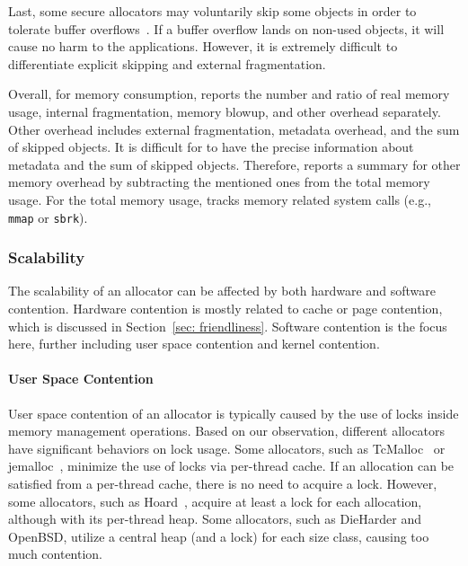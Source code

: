  Last, some secure allocators may voluntarily skip some objects in order to tolerate buffer overflows~\citep{DieHard, DieHarder, Guarder}. If a buffer overflow lands on non-used objects, it will cause no harm to the applications. However, it is extremely difficult to differentiate explicit skipping and external fragmentation. 

Overall, for memory consumption, \MP{} reports the number and ratio of real memory usage, internal fragmentation, memory blowup, and other overhead separately. Other overhead includes external fragmentation, metadata overhead, and the sum of skipped objects. It is difficult for \MP{} to have the precise information about metadata and the sum of skipped objects. Therefore, \MP{} reports a summary for other memory overhead by subtracting the mentioned ones from the total memory usage. For the total memory usage, \MP{} tracks memory related system calls (e.g., \texttt{mmap} or \texttt{sbrk}). 


\subsubsection{Scalability} 
\label{sec:scalability}

The scalability of an allocator can be affected by both hardware and software contention. Hardware contention is mostly related to cache or page contention, which is discussed in Section~\ref{sec: friendliness}. Software contention is the focus here, further including user space contention and kernel contention. 

\paragraph{User Space Contention} User space contention of an allocator is typically caused by the use of locks inside memory management operations. Based on our observation, different allocators have significant behaviors on lock usage. Some allocators, such as TcMalloc~\citep{tcmalloc} or jemalloc~\citep{jemalloc}, minimize the use of locks via per-thread cache. If an allocation can be satisfied from a per-thread cache, there is no need to acquire a lock. However, some allocators, such as Hoard~\citep{Hoard}, acquire at least a lock for each allocation, although with its per-thread heap. Some allocators, such as DieHarder and OpenBSD, utilize a central heap (and a lock) for each size class, causing too much contention. 


